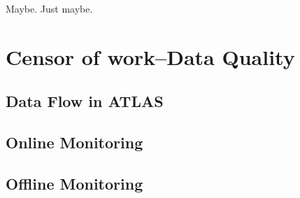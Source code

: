\begin{savequote}[75mm]
Maybe. Just maybe.
\end{savequote}

\chapter{Censor of work--Data Quality}

\section{Data Flow in ATLAS}

\section{Online Monitoring}

\section{Offline Monitoring}


